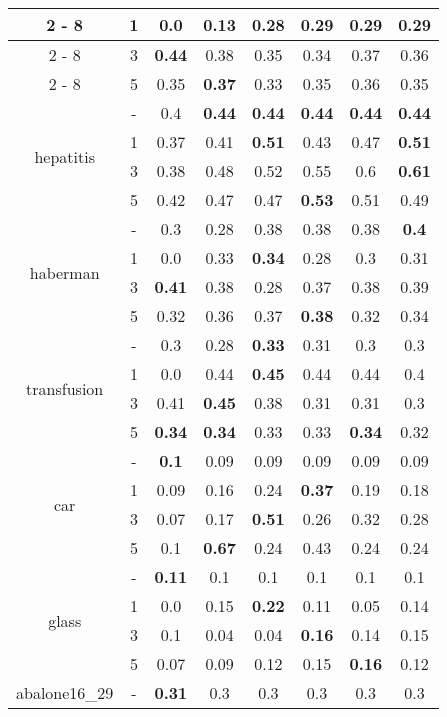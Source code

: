 \documentclass{article}%
\begin{document}
\begin{longtable}{c|c|cccccc}
\cline{2%
-%
8}%
&1&0.0&0.13&0.28&\textbf{0.29}&\textbf{0.29}&\textbf{0.29}\\%
\cline{2%
-%
8}%
&3&\textbf{0.44}&0.38&0.35&0.34&0.37&0.36\\%
\cline{2%
-%
8}%
&5&0.35&\textbf{0.37}&0.33&0.35&0.36&0.35\\%
\hline%
\multirow{4}{*}{hepatitis}&{-}&0.4&\textbf{0.44}&\textbf{0.44}&\textbf{0.44}&\textbf{0.44}&\textbf{0.44}\\%
\cline{2%
-%
8}%
&1&0.37&0.41&\textbf{0.51}&0.43&0.47&\textbf{0.51}\\%
\cline{2%
-%
8}%
&3&0.38&0.48&0.52&0.55&0.6&\textbf{0.61}\\%
\cline{2%
-%
8}%
&5&0.42&0.47&0.47&\textbf{0.53}&0.51&0.49\\%
\hline%
\multirow{4}{*}{haberman}&{-}&0.3&0.28&0.38&0.38&0.38&\textbf{0.4}\\%
\cline{2%
-%
8}%
&1&0.0&0.33&\textbf{0.34}&0.28&0.3&0.31\\%
\cline{2%
-%
8}%
&3&\textbf{0.41}&0.38&0.28&0.37&0.38&0.39\\%
\cline{2%
-%
8}%
&5&0.32&0.36&0.37&\textbf{0.38}&0.32&0.34\\%
\hline%
\multirow{4}{*}{transfusion}&{-}&0.3&0.28&\textbf{0.33}&0.31&0.3&0.3\\%
\cline{2%
-%
8}%
&1&0.0&0.44&\textbf{0.45}&0.44&0.44&0.4\\%
\cline{2%
-%
8}%
&3&0.41&\textbf{0.45}&0.38&0.31&0.31&0.3\\%
\cline{2%
-%
8}%
&5&\textbf{0.34}&\textbf{0.34}&0.33&0.33&\textbf{0.34}&0.32\\%
\hline%
\multirow{4}{*}{car}&{-}&\textbf{0.1}&0.09&0.09&0.09&0.09&0.09\\%
\cline{2%
-%
8}%
&1&0.09&0.16&0.24&\textbf{0.37}&0.19&0.18\\%
\cline{2%
-%
8}%
&3&0.07&0.17&\textbf{0.51}&0.26&0.32&0.28\\%
\cline{2%
-%
8}%
&5&0.1&\textbf{0.67}&0.24&0.43&0.24&0.24\\%
\hline%
\multirow{4}{*}{glass}&{-}&\textbf{0.11}&0.1&0.1&0.1&0.1&0.1\\%
\cline{2%
-%
8}%
&1&0.0&0.15&\textbf{0.22}&0.11&0.05&0.14\\%
\cline{2%
-%
8}%
&3&0.1&0.04&0.04&\textbf{0.16}&0.14&0.15\\%
\cline{2%
-%
8}%
&5&0.07&0.09&0.12&0.15&\textbf{0.16}&0.12\\%
\hline%
\multirow{4}{*}{abalone16\_29}&{-}&\textbf{0.31}&0.3&0.3&0.3&0.3&0.3\\%

\end{longtable}
\end{document}
